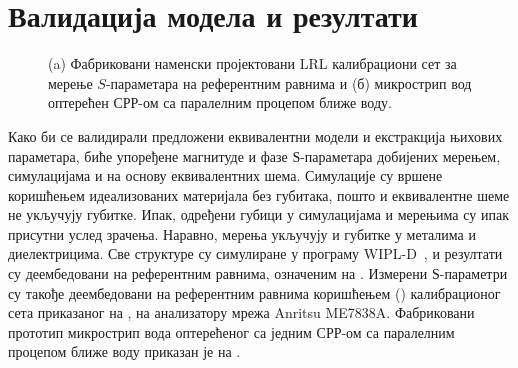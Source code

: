 \documentclass[main.tex]{subfiles}
\begin{document}
\section{Валидација модела и резултати}

\begin{figure}[!t]
\centering
{}\hfill
{}
\caption{(a) Фабриковани наменски пројектовани LRL калибрациони сет за мерење $S$-параметара на референтним равнима и (б) микрострип вод оптерећен СРР-ом са паралелним процепом ближе воду.} 
\label{f9}
\end{figure}
Како би се валидирали предложени еквивалентни модели и екстракција њихових параметара, биће упоређене магнитуде и фазе $Ѕ$-параметара добијених мерењем, симулацијама и на основу еквивалентних шема. Симулације су вршене коришћењем идеализованих материјала без губитака, пошто и еквивалентне шеме не укључују губитке. Ипак, одређени губици у симулацијама и мерењима су ипак присутни услед зрачења. Наравно, мерења укључују и губитке у металима и диелектрицима. Све структуре су симулиране у програму WIPL-D~\cite{wipl}, и резултати су деембедовани на референтним равнима, означеним на . Измерени $Ѕ$-параметри су такође деембедовани на референтним равнима коришћењем  () калибрационог сета приказаног на , на анализатору мрежа Anritsu ME7838A. Фабриковани прототип микрострип вода оптерећеног са једним СРР-ом са паралелним процепом ближе воду приказан је на .
\end{document}
